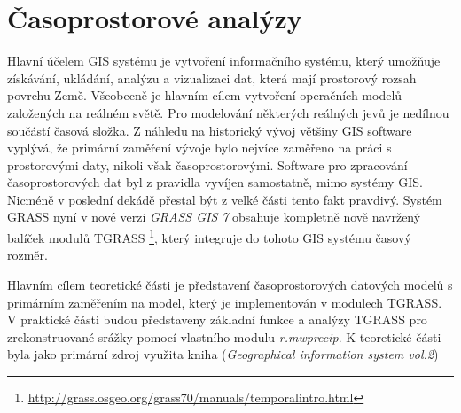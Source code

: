 \documentclass[a4paper,12pt,oneside]{report}
\begin{document}
\section{Časoprostorové analýzy}
Hlavní účelem GIS systému je  vytvoření informačního systému, který umožňuje získávání, ukládání, analýzu a vizualizaci dat, která mají prostorový rozsah povrchu Země. Všeobecně je hlavním cílem vytvoření operačních modelů založených na reálném světě. Pro modelování některých reálných jevů je nedílnou součástí časová složka. Z náhledu na historický vývoj většiny GIS software vyplývá, že primární zaměření vývoje bylo nejvíce zaměřeno na práci s prostorovými daty, nikoli však časoprostorovými. Software pro zpracování  časoprostorových dat byl z pravidla vyvíjen samostatně, mimo systémy GIS. Nicméně v poslední dekádě přestal být z velké části tento fakt pravdivý.\cite{geospatialanal} Systém GRASS nyní v nové verzi \textit{GRASS GIS 7 } obsahuje kompletně nově navržený balíček modulů TGRASS \footnote{\url{http://grass.osgeo.org/grass70/manuals/temporalintro.html}}, který integruje do tohoto GIS systému časový rozměr.

Hlavním cílem teoretické části je představení časoprostorových datových modelů s primárním zaměřením na model, který je implementován v  modulech TGRASS. V praktické části budou představeny základní funkce a analýzy TGRASS pro zrekonstruované srážky pomocí vlastního modulu \textit{r.mwprecip}. K teoretické části byla jako primární zdroj využita kniha (\textit{Geographical information system vol.2})\cite{gistemporal}
\end{document}
